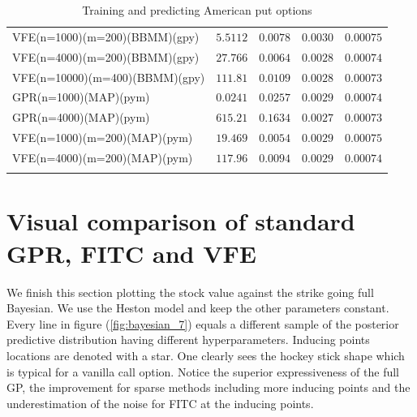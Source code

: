 \documentclass[12pt,a4paper,oneside]{book}
\begin{document}
\begin{table}
\begin{tabular}[t]{lcccc}
VFE(n=1000)(m=200)(BBMM)(gpy)  & $5.5112$ &  $0.0078$   & $0.0030$ &  $0.00075$ \\\addlinespace
VFE(n=4000)(m=200)(BBMM)(gpy)  & $27.766$ & $0.0064$    & $0.0028$  &    $0.00074$ \\\addlinespace
VFE(n=10000)(m=400)(BBMM)(gpy)  & $111.81$ & $0.0109$    & $0.0028$  &  $0.00073$ \\\addlinespace
GPR(n=1000)(MAP)(pym)  & $0.0241$ &  $0.0257$   & $0.0029$ &  $0.00074$ \\\addlinespace
GPR(n=4000)(MAP)(pym)  & $615.21$ & $0.1634$    & $\bm{0.0027}$ &  $\bm{0.00073}$  \\\addlinespace
VFE(n=1000)(m=200)(MAP)(pym)  & $19.469$  &  $0.0054$   & $0.0029$ &    $0.00075$ \\\addlinespace
VFE(n=4000)(m=200)(MAP)(pym)  & $117.96$ & $0.0094$    & $0.0029$ &     $0.00074$ \\\addlinespace
\\\bottomrule
\end{tabular}
\caption{Training and predicting American put options}\label{Result_American}
\end{table}

\fi

\clearpage

\section{Visual comparison of standard GPR, FITC and VFE}

We finish this section plotting the stock value against the strike going full Bayesian. We use the Heston model and keep the other parameters constant. Every line in figure (\ref{fig:bayesian_7}) equals a different sample of the posterior predictive distribution having different hyperparameters. Inducing points locations are denoted with a star. One clearly sees the hockey stick shape which is typical for a vanilla call option. Notice the superior expressiveness of the full GP, the improvement for sparse methods including more inducing points and the underestimation of the noise for FITC at the inducing points.
\end{document}
